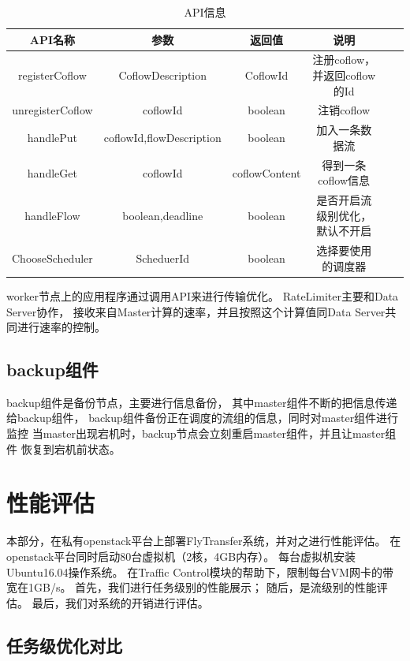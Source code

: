  
 \begin{table}[h]
\centering
\footnotesize
 \caption{API信息} \label{Master:API}
\begin{tabular}{|c|c|c|c|c|c|} \hline
\toprule
API名称  &参数&返回值&说明 \\
\toprule
registerCoflow&CoflowDescription&CoflowId&注册coflow，并返回coflow的Id\\
\toprule
unregisterCoflow&coflowId&boolean&注销coflow\\
\toprule
handlePut&coflowId,flowDescription&boolean&加入一条数据流\\
\toprule
handleGet&coflowId&coflowContent&得到一条coflow信息\\
\toprule
handleFlow&boolean,deadline&boolean&是否开启流级别优化，默认不开启\\
\toprule
ChooseScheduler&ScheduerId&boolean&选择要使用的调度器\\
\toprule
\end{tabular}
\end{table}
worker节点上的应用程序通过调用API来进行传输优化。
RateLimiter主要和Data Server协作，
接收来自Master计算的速率，并且按照这个计算值同Data Server共同进行速率的控制。


 \subsection{backup组件}
 backup组件是备份节点，主要进行信息备份，
 其中master组件不断的把信息传递给backup组件，
 backup组件备份正在调度的流组的信息，同时对master组件进行监控
 当master出现宕机时，backup节点会立刻重启master组件，并且让master组件
 恢复到宕机前状态。
 
 \section{性能评估}
本部分，在私有openstack平台上部署FlyTransfer系统，并对之进行性能评估。
在openstack平台同时启动80台虚拟机（2核，4GB内存）。
每台虚拟机安装Ubuntu16.04操作系统。
在Traffic Control模块\cite{TC}的帮助下，限制每台VM网卡的带宽在1GB/s。
首先，我们进行任务级别的性能展示；
随后，是流级别的性能评估。
最后，我们对系统的开销进行评估。

 \subsection{任务级优化对比}

